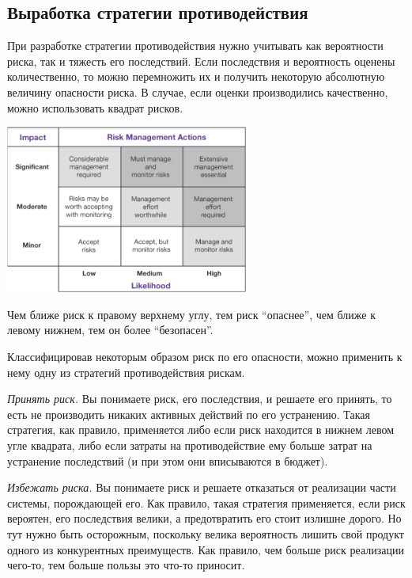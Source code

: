 \documentclass{../../text-style}
\begin{document}
\subsection{Выработка стратегии противодействия}

При разработке стратегии противодействия нужно учитывать как вероятности риска, так и тяжесть его последствий. Если последствия и вероятность оценены количественно, то можно перемножить их и получить некоторую абсолютную величину опасности риска. В случае, если оценки производились качественно, можно использовать квадрат рисков.

\begin{center}
    \includegraphics[width=0.6\textwidth]{riskMatrix.png}
\end{center}

Чем ближе риск к правому верхнему углу, тем риск \enquote{опаснее}, чем ближе к левому нижнем, тем он более \enquote{безопасен}.

Классифицировав некоторым образом риск по его опасности, можно применить к нему одну из стратегий противодействия рискам.

\emph{Принять риск.} Вы понимаете риск, его последствия, и решаете его принять, то есть не производить никаких активных действий по его устранению. Такая стратегия, как правило, применяется либо если риск находится в нижнем левом угле квадрата, либо если затраты на противодействие ему больше затрат на устранение последствий (и при этом они вписываются в бюджет).

\emph{Избежать риска.} Вы понимаете риск и решаете отказаться от реализации части системы, порождающей его. Как правило, такая стратегия применяется, если риск вероятен, его последствия велики, а предотвратить его стоит излишне дорого. Но тут нужно быть осторожным, поскольку велика вероятность лишить свой продукт одного из конкурентных преимуществ. Как правило, чем больше риск реализации чего-то, тем больше пользы это что-то приносит.
\end{document}
